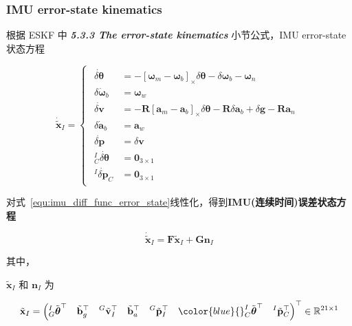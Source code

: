 \documentclass[12pt,a4paper]{article}
\begin{document}
\subsubsection{IMU error-state kinematics}

根据 \cite{DBLP:journals/corr/abs-1711-02508} ESKF 中 \textit{\textbf{5.3.3 The error-state kinematics}} 小节公式，IMU error-state状态方程

\begin{equation}
\label{equ:imu_diff_func_error_state}
\dot{\tilde{\mathbf{x}}}_I = 
\begin{cases}
\begin{aligned}
\dot{\delta \boldsymbol{\theta}} &= -\left[\boldsymbol{\omega}_{m}-\boldsymbol{\omega}_{b}\right]_{ \times} \delta \boldsymbol{\theta}-\delta \boldsymbol{\omega}_{b}-\boldsymbol{\omega}_{n} \\

\delta \dot{\boldsymbol{\omega}}_{b} &= \boldsymbol{\omega}_{w} \\

\dot{\delta \mathbf{v}} &= -\mathbf{R}\left[\mathbf{a}_{m}-\mathbf{a}_{b}\right]_{ \times} \delta \boldsymbol{\theta}-\mathbf{R} \delta \mathbf{a}_{b}+\delta \mathbf{g}-\mathbf{R} \mathbf{a}_{n} \\

\delta \dot{\mathbf{a}}_{b} &= \mathbf{a}_{w} \\ 

\dot{\delta \mathbf{p}} &= \delta \mathbf{v} \\

{}^I_C\dot{\delta \boldsymbol{\theta}} &= \mathbf{0}_{3\times 1} \\
{}^I\dot{\delta \mathbf{p}}_C &= \mathbf{0}_{3\times 1}
\end{aligned}
\end{cases}
\end{equation}

对式~\eqref{equ:imu_diff_func_error_state}线性化，得到\textbf{IMU(连续时间)误差状态方程}

\begin{equation}
\dot{\tilde{\mathbf{x}}}_I = 
\mathbf{F} \tilde{\mathbf{x}}_I + 
\mathbf{G} \mathbf{n}_I
\end{equation}

其中，

$\tilde{\mathbf{x}}_{I}$ 和 $\mathbf{n}_I$ 为

$$
\tilde{\mathbf{x}}_{I} = 
\left(
{}^I_G \tilde{\boldsymbol{\theta}}^\top \quad 
\tilde{\mathbf{b}}_g^\top \quad 
{}^G\tilde{\mathbf{v}}^\top_I \quad 
\tilde{\mathbf{b}}_a^\top \quad
{}^G\tilde{\mathbf{p}}^\top_I \quad
{\color{blue}
{}^I_C \tilde{\boldsymbol{\theta}}^\top \quad
{}^I\tilde{\mathbf{p}}^\top_C}
\right)^\top 
\in \mathbb{R}^{21 \times 1}
$$
\end{document}
